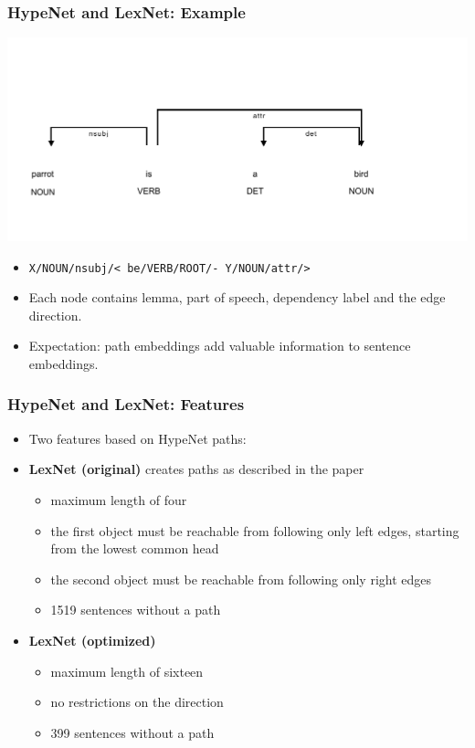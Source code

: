 \documentclass[11pt,aspectratio=169,usenames,dvipsnames]{beamer}
\begin{document}
    \begin{frame}[t]
        \frametitle{HypeNet and LexNet: Example}
        \begin{center}
            \includegraphics[scale=0.7,trim={0cm 0.5cm 0cm 0.25cm},clip]{images/hypenet_example}
        \end{center}

        \begin{itemize}
            \item \texttt{X/NOUN/nsubj/< be/VERB/ROOT/- Y/NOUN/attr/>}
            \item Each node contains lemma, part of speech, dependency label and the edge direction.
            \item Expectation: path embeddings add valuable information to sentence embeddings.

        \end{itemize}
    \end{frame}


    \begin{frame}[t]
        \frametitle{HypeNet and LexNet: Features}
        \begin{itemize}
            \item Two features based on HypeNet paths:\pause
            \item \textbf{LexNet (original)} creates paths as described in the paper
            \begin{itemize}
                \item maximum length of four
                \item the first object must be reachable from following only left edges, starting from the lowest common head
                \item the second object must be reachable from following only right edges 
                \item 1519 sentences without a path\pause
            \end{itemize}
            \item \textbf{LexNet (optimized)}
            \begin{itemize}
                \item maximum length of sixteen
                \item no restrictions on the direction
                \item 399 sentences without a path
            \end{itemize}
        \end{itemize}
    \end{frame}
\end{document}
